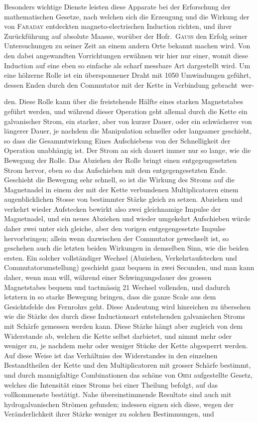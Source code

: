 Besonders wichtige Dienste leisten diese Apparate bei der Erforschung der mathematischen Gesetze, nach welchen sich die Erzeugung und die Wirkung der von \textsc{Faraday} entdeckten magneto-electrischen Induction richten, und ihrer Zurückführung auf absolute Maasse, worüber der Hofr.\ \textsc{Gauss} den Erfolg seiner Untersuchungen zu seiner Zeit an einem andern Orte bekannt machen wird. Von den dabei angewandten Vorrichtungen erwähnen wir hier nur einer, womit diese Induction auf eine eben so einfache als scharf messbare Art dargestellt wird. Um eine hölzerne Rolle ist ein übersponnener Draht mit 1050 Umwindungen geführt, dessen Enden durch den Commutator mit der Kette in Verbindung gebracht~wer-
\par\clearpage
{}
\noindent den. Diese Rolle kann über die freistehende Hälfte eines starken Magnetstabes geführt werden, und während dieser Operation geht allemal durch die Kette ein galvanischer Strom, ein starker, aber von kurzer Dauer, oder ein schwächerer von längerer Dauer, je nachdem die Manipulation schneller oder langsamer geschieht, so dass die Gesammtwirkung Eines Aufschiebens von der Schnelligkeit der Operation unabhängig ist. Der Strom an sich dauert immer nur so lange, wie die Bewegung der Rolle. Das Abziehen der Rolle bringt einen entgegengesetzten Strom hervor, eben so das Aufschieben mit dem entgegengesetzten Ende. Geschieht die Bewegung sehr schnell, so ist die Wirkung des Stroms auf die Magnetnadel in einem der mit der Kette verbundenen Multiplicatoren einem augenblicklichen Stosse von bestimmter Stärke gleich zu setzen. Abziehen und verkehrt wieder Aufstecken bewirkt also zwei gleichnamige Impulse der Magnetnadel, und ein neues Abziehen und wieder umgekehrt Aufschieben würde daher zwei unter sich gleiche, aber den vorigen entgegengesetzte Impulse hervorbringen; allein wenn dazwischen der Commutator gewechselt ist, so geschehen auch die letzten beiden Wirkungen in demselben Sinn, wie die beiden ersten. Ein solcher vollständiger Wechsel (Abziehen, Verkehrtaufstecken und Commutatorumstellung) geschieht ganz bequem in zwei Secunden, und man kann daher, wenn man will, während einer Schwingungsdauer des grossen Magnetstabes bequem und tactmässig 21 Wechsel vollenden, und dadurch letztern in so starke Bewegung bringen, dass die ganze Scale aus dem Gesichtsfelde des Fernrohrs geht. Diese Andeutung wird hinreichen zu übersehen wie die Stärke des durch diese Inductionsart entstehenden galvanischen Stroms mit Schärfe gemessen werden kann. Diese Stärke hängt aber zugleich von dem Widerstande ab, welchen die Kette selbst darbietet, und nimmt mehr oder weniger zu, je nachdem mehr oder weniger Stücke der Kette abgesperrt werden. Auf diese Weise ist das Verhältniss des Widerstandes in den einzelnen Bestandtheilen der Kette und den Multiplicatoren mit grosser Schärfe bestimmt, und durch mannigfaltige Combinationen das schöne von \textsc{Ohm} aufgestellte Gesetz, welches die Intensität eines Stroms bei einer Theilung befolgt, auf das vollkommenste bestätigt. Nahe übereinstimmende Resultate sind auch mit hydrogalvanischen Strömen gefunden; indessen eignen sich diese, wegen der Veränderlichkeit ihrer Stärke weniger zu solchen Bestimmungen, und 
